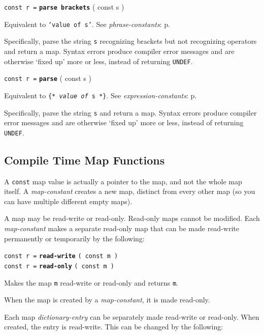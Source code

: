 \documentclass[12pt]{article}
\newcommand{\ttkey}[1]{{\tt \bfseries #1}}
\newcommand{\pagref}[1]{p\pageref{#1}}
\newenvironment{indpar}[1][0.3in]%
	{\begin{list}{}%
		     {\setlength{\itemsep}{0in}%
		      \setlength{\topsep}{0in}%
		      \setlength{\parsep}{1ex}%
		      \setlength{\labelwidth}{#1}%
		      \setlength{\leftmargin}{#1}%
		      \addtolength{\leftmargin}{\labelsep}}%
	 \item}%
	{\end{list}}
\begin{document}
{\tt const r =} \ttkey{parse brackets} ( const s  )
\begin{indpar}
Equivalent to {\tt `{\rm \em value of} s'}.
See {\em phrase-constants}: \pagref{PHRASE-CONSTANT}.

Specifically, parse the string {\tt s} recognizing brackets
but not recognizing operators and return a map.
Syntax errors produce compiler error messages and are
otherwise `fixed up' more or less, instead of returning {\tt UNDEF}.
\end{indpar}

{\tt const r =} \ttkey{parse} ( const s  )
\begin{indpar}
Equivalent to {\tt \{* {\rm \em value of} s *\}}.
See {\em expression-constants}: \pagref{EXPRESSION-CONSTANT}.

Specifically, parse the string {\tt s} and return a map.
Syntax errors produce compiler error messages and are
otherwise `fixed up' more or less, instead of returning {\tt UNDEF}.
\end{indpar}

\subsection{Compile Time Map Functions}

A {\tt const} map value is actually a pointer to the map,
and not the whole map itself.
A {\em map-constant} creates a new map, distinct from every
other map (so you can have multiple different empty maps).

A map may be read-write or read-only.\label{READ-ONLY-MAP}
Read-only maps cannot
be modified.  Each {\em map-constant} makes a separate read-only
map that can be made read-write permanently or temporarily by
the following:

{\tt const r =} \ttkey{read-write} {\tt ( const m )} \\
{\tt const r =} \ttkey{read-only} {\tt ( const m )}
\begin{indpar}
Makes the map {\tt m} read-write or read-only and returns {\tt m}.

When the map is created by a {\em map-constant}, it is made read-only.
\end{indpar}

Each map {\em dictionary-entry} can be separately made read-write or
read-only.  When created, the entry is read-write.  This can be
changed by the following:
\end{document}
